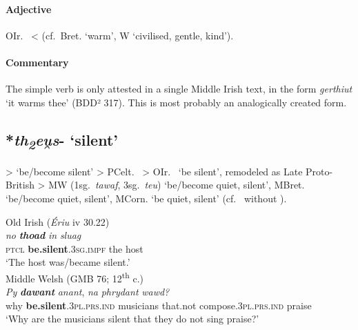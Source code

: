 \documentclass[output=paper,colorlinks,citecolor=brown]{langscibook}
\begin{document}
\paragraph*{Adjective}

OIr.\   <  (cf.\ Bret.  ‘warm’, W  ‘civilised, gentle, kind’).

\paragraph*{Commentary}

The simple verb  is only attested in a single Middle Irish text, in the form \textit{gerthiut} ‘it warms thee’ (BDD² 317). This is most probably an analogically created form.

\subsection{*\textit{th\textsubscript{2}eu̯s}- ‘silent’}
\label{sec:STPsilent}

 > ‘be/become silent’ > PCelt.\  > OIr.\  ‘be silent’, remodeled as Late Proto-British  > MW  (1sg.\ \textit{tawaf}, 3sg.\ \textit{teu}) ‘be/become quiet, silent’, MBret.\  ‘be/become quiet, silent’, MCorn.  ‘be quiet, silent’ (cf.\ \citealt[621--623]{Schumacher2004} without ).

\begin{exe}
    \ex Old Irish (\textit{Ériu} iv 30.22)\label{ex:STPsilent1}\\
        \gll \textit{no} {\textit{\textbf{thoad}} } \textit{in} \textit{sluag}  \\
        \textsc{ptcl} \textbf{be.silent}.\textsc{3sg.impf} the host \\
        \glt ‘The host was/became silent.’\\
    \ex Middle Welsh (GMB 76; 12\textsuperscript{th} c.)\label{ex:STPsilent2}\\
        \gll \textit{Py} {\textit{\textbf{dawant}} } \textit{anant}, \textit{na} \textit{phrydant} \textit{wawd?} \\
        why \textbf{be.silent}.\textsc{3pl.prs.ind} musicians that.not compose.\textsc{3pl.prs.ind} praise \\
        \glt ‘Why are the musicians silent that they do not sing praise?’\\
\end{exe}
\end{document}
